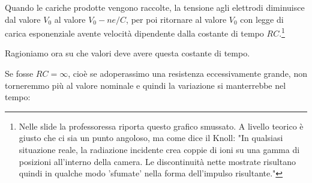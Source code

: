 

Quando le cariche prodotte vengono raccolte, la tensione agli elettrodi diminuisce dal valore $V_0$ al valore $V_0 - ne/C$, per poi ritornare al valore $V_0$ con legge di carica
esponenziale avente velocità dipendente dalla costante di tempo $RC$.\footnote{Nelle slide la professoressa riporta questo grafico smussato. A livello teorico è giusto che ci sia un punto angoloso, ma come dice il Knoll: "In qualsiasi situazione reale, la radiazione incidente crea coppie di ioni su una gamma di posizioni all'interno della camera. Le discontinuità nette mostrate risultano quindi in qualche modo 'sfumate' nella forma dell'impulso risultante."}

\begin{figure}[H]
   \centering
\end{figure}

Ragioniamo ora su che valori deve avere questa costante di tempo.

Se fosse $RC=\infty$, cioè se adoperassimo una resistenza eccessivamente grande, non torneremmo più al valore nominale e quindi la variazione si manterrebbe nel tempo:

\begin{figure}[H]
   \centering
\end{figure}

